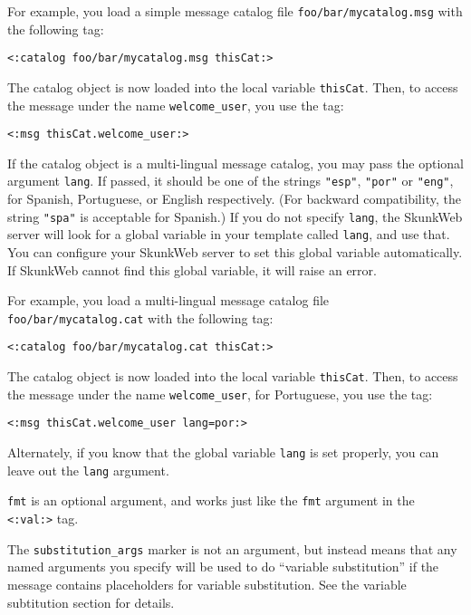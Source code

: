 \documentclass{manual}
\begin{document}
For example, you load a simple message catalog file
\texttt{foo/bar/mycatalog.msg} with the following tag:

\begin{verbatim}
<:catalog foo/bar/mycatalog.msg thisCat:>
\end{verbatim}

The catalog object is now loaded into the local variable
\texttt{thisCat}. Then, to access the message under the name
\texttt{welcome_user}, you use the tag:

\begin{verbatim}
<:msg thisCat.welcome_user:>
\end{verbatim}

If the catalog object is a multi-lingual message catalog,
you may pass the optional argument \texttt{lang}. If passed,
it should be one of the strings \texttt{"esp"}, 
\texttt{"por"} or \texttt{"eng"}, for Spanish, Portuguese,
or English respectively. (For backward compatibility, the
string \texttt{"spa"} is acceptable for Spanish.)
If you do not specify \texttt{lang},
the SkunkWeb server will look for a global variable in your template
called \texttt{lang}, and use that.  You can configure your SkunkWeb
server to set this global variable automatically.  If SkunkWeb cannot
find this global variable, it will raise an error.

For example, you load a multi-lingual message catalog file
\texttt{foo/bar/mycatalog.cat} with the following tag:

\begin{verbatim}
<:catalog foo/bar/mycatalog.cat thisCat:>
\end{verbatim}


The catalog object is now loaded into the local variable
\texttt{thisCat}. Then, to access the message under the name
\texttt{welcome_user}, for Portuguese, you use the tag:

\begin{verbatim}
<:msg thisCat.welcome_user lang=por:>
\end{verbatim}

Alternately, if you know that the global variable \texttt{lang}
is set properly, you can leave out the \texttt{lang} argument.

\texttt{fmt} is an optional argument, and works just like 
the \texttt{fmt} argument in the 
\texttt{<:val:>} 
tag.

The \texttt{substitution_args} marker is not an argument, but instead
means that any named arguments you specify will be used to do
``variable substitution'' if the message contains placeholders
for variable substitution. See the 
variable subtitution 
section for details.
\end{document}
